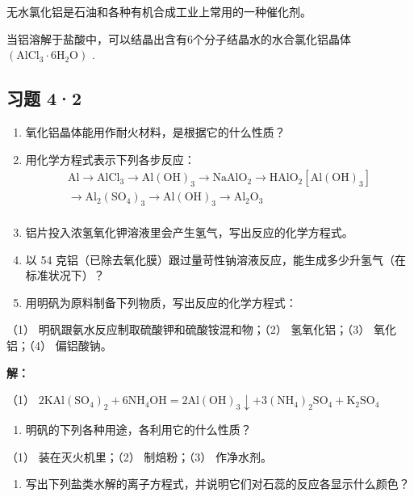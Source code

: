 无水氯化铝是石油和各种有机合成工业上常用的一种催化剂。

当铝溶解于盐酸中，可以结晶出含有6个分子结晶水的水合氯化铝晶体
\(\left(\mathrm{AlCl}_{3}\cdot6\mathrm{H}_{2}\mathrm{O}\right)\) .

\subsection{习题 4·2}

\begin{enumerate}
\item
  氧化铝晶体能用作耐火材料，是根据它的什么性质？
\item
  用化学方程式表示下列各步反应：
\[
\begin{array}{l} \mathrm{Al} \longrightarrow \mathrm{AlCl} _ {3} \longrightarrow \mathrm{Al} (\mathrm{OH}) _ {3} \longrightarrow \mathrm{NaAlO} _ {2} \longrightarrow \mathrm{HAlO} _ {2} [ \mathrm{Al} (\mathrm{OH}) _ {3} ] \\ \longrightarrow \mathrm{Al} _ {2} (\mathrm{SO} _ {4}) _ {3} \longrightarrow \mathrm{Al} (\mathrm{OH}) _ {3} \longrightarrow \mathrm{Al} _ {2} \mathrm{O} _ {3} \\ \end{array}
\]
\item
  铝片投入浓氢氧化钾溶液里会产生氢气，写出反应的化学方程式。
\item
  以 54
  克铝（已除去氧化膜）跟过量苛性钠溶液反应，能生成多少升氢气（在标准状况下）？
\item
  用明矾为原料制备下列物质，写出反应的化学方程式：
\end{enumerate}

（1） 明矾跟氨水反应制取硫酸钾和硫酸铵混和物；（2） 氢氧化铝；（3）
氧化铝；（4） 偏铝酸钠。

\textbf{解：}

（1）
\(2\mathrm{KAl}(\mathrm{SO}_4)_2 + 6\mathrm{NH}_4\mathrm{OH} = 2\mathrm{Al(OH)}_3\downarrow +3(\mathrm{NH}_4)_2\mathrm{SO}_4 + \mathrm{K}_2\mathrm{SO}_4\)

\begin{enumerate}[start=6]
\item
  明矾的下列各种用途，各利用它的什么性质？
\end{enumerate}

（1） 装在灭火机里；（2） 制焙粉；（3） 作净水剂。

\begin{enumerate}[start=7]
\item
  写出下列盐类水解的离子方程式，并说明它们对石蕊的反应各显示什么颜色？
\end{enumerate}

